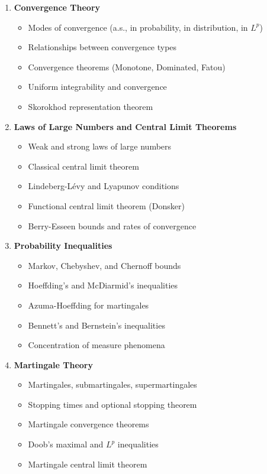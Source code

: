 \documentclass[12pt,a4paper]{article}
\theoremstyle{remark}
\begin{document}
\begin{enumerate}
\item \textbf{Convergence Theory}
   \begin{itemize}
   \item Modes of convergence (a.s., in probability, in distribution, in $L^p$)
   \item Relationships between convergence types
   \item Convergence theorems (Monotone, Dominated, Fatou)
   \item Uniform integrability and convergence
   \item Skorokhod representation theorem
   \end{itemize}

\item \textbf{Laws of Large Numbers and Central Limit Theorems}
   \begin{itemize}
   \item Weak and strong laws of large numbers
   \item Classical central limit theorem
   \item Lindeberg-Lévy and Lyapunov conditions
   \item Functional central limit theorem (Donsker)
   \item Berry-Esseen bounds and rates of convergence
   \end{itemize}

\item \textbf{Probability Inequalities}
   \begin{itemize}
   \item Markov, Chebyshev, and Chernoff bounds
   \item Hoeffding's and McDiarmid's inequalities
   \item Azuma-Hoeffding for martingales
   \item Bennett's and Bernstein's inequalities
   \item Concentration of measure phenomena
   \end{itemize}

\item \textbf{Martingale Theory}
   \begin{itemize}
   \item Martingales, submartingales, supermartingales
   \item Stopping times and optional stopping theorem
   \item Martingale convergence theorems
   \item Doob's maximal and $L^p$ inequalities
   \item Martingale central limit theorem
   \end{itemize}


\end{enumerate}
\end{document}
